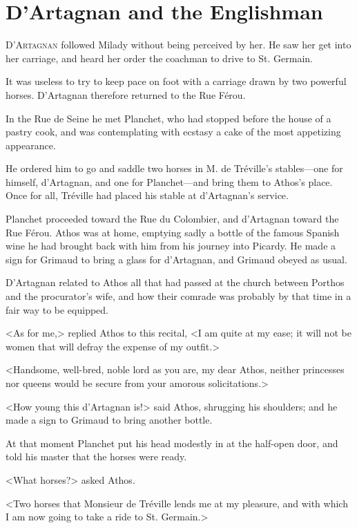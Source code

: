 
\chapter{D'Artagnan and the Englishman} 
	
	\lettrine[]{D}{'Artagnan} followed Milady without being perceived by her. He saw her get into her carriage, and heard her order the coachman to drive to St. Germain. 

\zz
It was useless to try to keep pace on foot with a carriage drawn by two powerful horses. D'Artagnan therefore returned to the Rue Férou. 

In the Rue de Seine he met Planchet, who had stopped before the house of a pastry cook, and was contemplating with ecstasy a cake of the most appetizing appearance. 

He ordered him to go and saddle two horses in M. de Tréville's stables---one for himself, d'Artagnan, and one for Planchet---and bring them to Athos's place. Once for all, Tréville had placed his stable at d'Artagnan's service. 

Planchet proceeded toward the Rue du Colombier, and d'Artagnan toward the Rue Férou. Athos was at home, emptying sadly a bottle of the famous Spanish wine he had brought back with him from his journey into Picardy. He made a sign for Grimaud to bring a glass for d'Artagnan, and Grimaud obeyed as usual. 

D'Artagnan related to Athos all that had passed at the church between Porthos and the procurator's wife, and how their comrade was probably by that time in a fair way to be equipped. 

<As for me,> replied Athos to this recital, <I am quite at my ease; it will not be women that will defray the expense of my outfit.> 

<Handsome, well-bred, noble lord as you are, my dear Athos, neither princesses nor queens would be secure from your amorous solicitations.> 

<How young this d'Artagnan is!> said Athos, shrugging his shoulders; and he made a sign to Grimaud to bring another bottle. 

At that moment Planchet put his head modestly in at the half-open door, and told his master that the horses were ready. 

<What horses?> asked Athos. 

<Two horses that Monsieur de Tréville lends me at my pleasure, and with which I am now going to take a ride to St. Germain.> 

